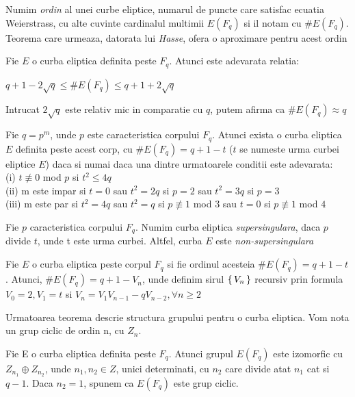 \begin{dfn}
Numim \textit{ordin} al unei curbe eliptice, numarul de puncte care satisfac ecuatia Weierstrass, cu alte cuvinte cardinalul multimii $E(F_q)$ si il notam cu $\# E(F_q)$. Teorema care urmeaza, datorata lui \textit{Hasse}, ofera o aproximare pentru acest ordin
\end{dfn}
\begin{teo}
Fie $E$ o curba eliptica definita peste $F_q$. Atunci este adevarata relatia:
\begin{center} $q + 1 - 2\sqrt{q}\leq \# E(F_q)\leq q+1 + 2\sqrt{q}$ \end{center}
Intrucat $2\sqrt{q}$ este relativ mic in comparatie cu $q$, putem afirma ca $\# E(F_q) \approx q$
\end{teo}
\begin{teo}
Fie $q = p^m$, unde $p$ este caracteristica corpului $F_q$. Atunci exista o curba eliptica $E$ definita peste acest corp, cu $\# E(F_q) = q+1-t$ ($t$ se numeste urma curbei eliptice $E$) daca si numai daca una dintre urmatoarele conditii este adevarata: \\
(i) $t \not\equiv 0$ mod $p$ si $t^2\leq 4q$ \\
(ii) m este impar si $t=0$ sau $t^2 = 2q$ si $p=2$ sau $t^2 = 3q$ si $p=3$ \\ 
(iii) m este par si $t^2 = 4q$ sau $t^2 = q$ si $p\not\equiv 1$ mod $3$ sau $t= 0$ si $p\not\equiv 1$ mod $4$
\end{teo}
\begin{dfn}
Fie $p$ caracteristica corpului $F_q$. Numim curba eliptica \textit{supersingulara}, daca $p$ divide $t$, unde t este urma curbei. Altfel, curba $E$ este \textit{non-supersingulara}
\end{dfn}
\begin{teo}
Fie $E$ o curba eliptica peste corpul $F_q$ si fie ordinul acesteia $\# E(F_q)= q+ 1-t$. Atunci, $\# E(F_q) = q+ 1 - V_n$, unde definim sirul $\set {V_n}$ recursiv prin formula $V_0 = 2, V_1=t$ si $V_n = V_1V_{n-1} - qV_{n-2}, \forall n\geq 2$
\end{teo}
Urmatoarea teorema descrie structura grupului pentru o curba eliptica. Vom nota un grup ciclic de ordin n, cu $Z_n$.
\begin{teo}
Fie E o curba eliptica definita peste $F_q$. Atunci grupul $E(F_q)$ este izomorfic cu $Z_{n_1} \oplus Z_{n_2}$, unde $n_1, n_2\in Z$, unici determinati, cu $n_2$ care divide atat $n_1$ cat si $q-1$. Daca $n_2=1$, spunem ca $E(F_q)$ este grup ciclic.
\end{teo}

